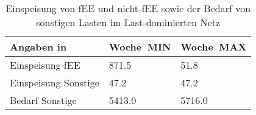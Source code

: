 {
\renewcommand{\arraystretch}{1.2}%
\begin{table}[H]
	\begin{center}
		\caption{Einspeisung von fEE und nicht-fEE sowie der Bedarf von sonstigen Lasten im Last-dominierten Netz}
		\begin{tabu} to 0.6\textwidth {X[1.7] X[1, r] X[1, r]}
			\toprule
			Angaben in \si{\mwh}	& Woche~MIN      & Woche~MAX      \\ \midrule
			Einspeisung fEE       	& \num{871.5}  & \num{51.8}   \\
			Einspeisung Sonstige 	& \num{47.2}   & \num{47.2}   \\
			Bedarf Sonstige       	& \num{5413.0} & \num{5716.0} \\ \bottomrule
		\end{tabu}
		\label{tab:load_dominated_char}
	\end{center}
	\vspace{-3mm}%
\end{table}
}